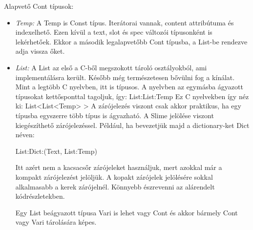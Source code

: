 Alapvető Cont típusok:
\begin{itemize}
\item \emph{Temp:} 
A Temp is Const típus. 
Iterátorai vannak, content attribútuma és indexelhető.
Ezen kívül a text, slot és spec változói típusonként is lekérhetőek.
Ekkor a második legalapvetőbb Cont típusba, a List-be rendezve adja vissza őket.
\item \emph{List:} 
A List az első a C-ből megszokott tároló osztályokból, ami implementálásra került.
Később még természetesen bővülni fog a kínálat.
Mint a legtöbb C nyelvben, itt is típusos.
A nyelvben az egymásba ágyazott típusokat kettősponttal tagoljuk, így: List:List:Temp
Ez C nyelvekben így néz ki: List<List<Temp> >
A zárójelezés viszont csak akkor praktikus, ha egy típusba egyszerre több típus is ágyazható. 
A Slime jelölése viszont kiegészíthető zárójelezéssel. 
Például, ha bevezetjük majd a dictionary-ket Dict néven:

List:Dict:(Text, List:Temp)

Itt azért nem a kacsacsőr zárójeleket használjuk, mert azokkal már a kompakt zárójelezést jelöljük.
A kopakt zárójelek jelölésére sokkal alkalmasabb a kerek zárójelnél. 
Könnyebb észrevenni az alárendelt kódrészletekben.

Egy List beágyazott típusa Vari is lehet vagy Cont és akkor bármely Cont vagy Vari tárolására képes.


\end{itemize}
